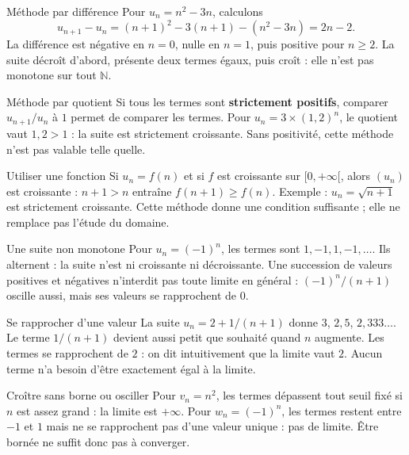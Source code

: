 \documentclass[aspectratio=169,12pt]{beamer}
\begin{document}
\renewcommand{\slidekind}{MÉTHODE \& EXEMPLE}
\begin{frame}[t,fragile]{Méthode par différence}
Pour $u_n=n^2-3n$, calculons \[u_{n+1}-u_n=(n+1)^2-3(n+1)-(n^2-3n)=2n-2.\] La différence est négative en $n=0$, nulle en $n=1$, puis positive pour $n\ge2$. La suite décroît d’abord, présente deux termes égaux, puis croît : elle n’est pas monotone sur tout $\mathbb N$.
\end{frame}
\renewcommand{\slidekind}{MÉTHODE \& EXEMPLE}
\begin{frame}[t,fragile]{Méthode par quotient}
Si tous les termes sont \textbf{strictement positifs}, comparer $u_{n+1}/u_n$ à $1$ permet de comparer les termes. Pour $u_n=3\times(1,2)^n$, le quotient vaut $1,2>1$ : la suite est strictement croissante. Sans positivité, cette méthode n’est pas valable telle quelle.
\end{frame}
\renewcommand{\slidekind}{COMPRENDRE}
\begin{frame}[t,fragile]{Utiliser une fonction}
Si $u_n=f(n)$ et si $f$ est croissante sur $[0,+\infty[$, alors $(u_n)$ est croissante : $n+1>n$ entraîne $f(n+1)\ge f(n)$. Exemple : $u_n=\sqrt{n+1}$ est strictement croissante. Cette méthode donne une condition suffisante ; elle ne remplace pas l’étude du domaine.
\end{frame}
\renewcommand{\slidekind}{COMPRENDRE}
\begin{frame}[t,fragile]{Une suite non monotone}
Pour $u_n=(-1)^n$, les termes sont $1,-1,1,-1,\ldots$. Ils alternent : la suite n’est ni croissante ni décroissante. Une succession de valeurs positives et négatives n’interdit pas toute limite en général : $(-1)^n/(n+1)$ oscille aussi, mais ses valeurs se rapprochent de $0$.
\end{frame}
\renewcommand{\slidekind}{COMPRENDRE}
\begin{frame}[t,fragile]{Se rapprocher d’une valeur}
La suite $u_n=2+1/(n+1)$ donne $3$, $2,5$, $2,333\ldots$. Le terme $1/(n+1)$ devient aussi petit que souhaité quand $n$ augmente. Les termes se rapprochent de $2$ : on dit intuitivement que la limite vaut $2$. Aucun terme n’a besoin d’être exactement égal à la limite.
\end{frame}
\renewcommand{\slidekind}{COMPRENDRE}
\begin{frame}[t,fragile]{Croître sans borne ou osciller}
Pour $v_n=n^2$, les termes dépassent tout seuil fixé si $n$ est assez grand : la limite est $+\infty$. Pour $w_n=(-1)^n$, les termes restent entre $-1$ et $1$ mais ne se rapprochent pas d’une valeur unique : pas de limite. Être bornée ne suffit donc pas à converger.
\end{frame}
\end{document}
